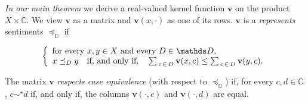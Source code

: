 \documentclass[ecta,nameyear,draft]{econsocart}
\newcommand{\R}{\mathbb R}
\newcommand{\mbbd}{{\mathds D}}
\newcommand{\mbbc}{{\mathds C}}
\newcommand{\fourdiv}{\textsc{iv}-\textsc{diversity}}
\theoremstyle{plain}
\newtheorem{observation}{Observation}
\theoremstyle{remark}
\begin{document}
\emph{In our main theorem}\label{sec-main} we derive a real-valued kernel
function $\mathbf{v}$ on the product $X \times \mbbc$. We view $\mathbf{v}$ as
a matrix and $\mathbf{v}(x, \cdot)$ as one of its rows.  $\mathbf{v}$ is a
\emph{represents} sentiments $\preceq_{\mbbd}$ if
\begin{linenomath*} 
  \begin{equation}\notag\label{eq-rep-main} \left\{
      \begin{array}{l} \text{for every $x , y \in X$ and every $D \in
        \mbbd$,}\\
        x \preceq_{D} y \quad \text{if, and only if,} \quad \sum _ {\, c \,\in\, D}
        \mathbf{v}(x, c) \leq \sum_{\, c \,\in\, D} \mathbf{v}(y, c) .
    \end{array}\right.
  \end{equation}
\end{linenomath*}
The matrix $\mathbf{v}$ \emph{respects case equivalence} (with respect to
$\preceq_{\mbbd}$) if, for every $c,d\in \mbbc$, $c \sim^{\star} d$ if, and
only if, the columns $\mathbf{v}(\cdot, c)$ and $\mathbf{v}(\cdot, d)$ are
equal.
\end{document}
